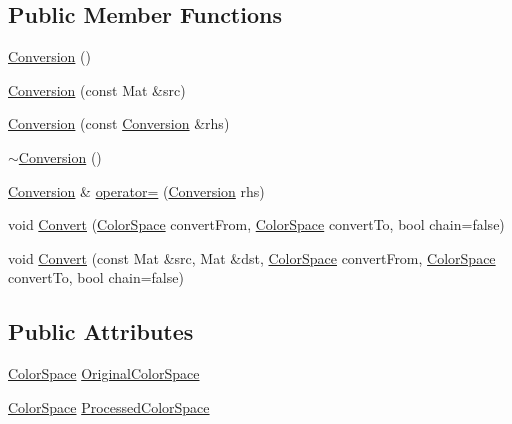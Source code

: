 \subsection*{Public Member Functions}
\begin{DoxyCompactItemize}
\item 
\hyperlink{class_vision_1_1_conversion_ade9665873e1ebd5e07f458d9dcf10996}{Conversion} ()
\item 
\hyperlink{class_vision_1_1_conversion_a9d881d8a0fc29f26afb84422fd8599f4}{Conversion} (const Mat \&src)
\item 
\hyperlink{class_vision_1_1_conversion_ada85747609dcedb2a117f06fd5c033ce}{Conversion} (const \hyperlink{class_vision_1_1_conversion}{Conversion} \&rhs)
\item 
\hyperlink{class_vision_1_1_conversion_a9a22cb622c0e847fa4635e7194c76d4d}{$\sim$\+Conversion} ()
\item 
\hyperlink{class_vision_1_1_conversion}{Conversion} \& \hyperlink{class_vision_1_1_conversion_ac1a6958a4d331108ad61f346f06319c7}{operator=} (\hyperlink{class_vision_1_1_conversion}{Conversion} rhs)
\item 
void \hyperlink{class_vision_1_1_conversion_ac78b687a5b6cdf4c0ae812b5d76b13fc}{Convert} (\hyperlink{class_vision_1_1_conversion_a0a21d4ccbb013185f1974d35ec86e388}{Color\+Space} convert\+From, \hyperlink{class_vision_1_1_conversion_a0a21d4ccbb013185f1974d35ec86e388}{Color\+Space} convert\+To, bool chain=false)
\item 
void \hyperlink{class_vision_1_1_conversion_a7795d9d544e89e672acff2747b2218f0}{Convert} (const Mat \&src, Mat \&dst, \hyperlink{class_vision_1_1_conversion_a0a21d4ccbb013185f1974d35ec86e388}{Color\+Space} convert\+From, \hyperlink{class_vision_1_1_conversion_a0a21d4ccbb013185f1974d35ec86e388}{Color\+Space} convert\+To, bool chain=false)
\end{DoxyCompactItemize}
\subsection*{Public Attributes}
\begin{DoxyCompactItemize}
\item 
\hyperlink{class_vision_1_1_conversion_a0a21d4ccbb013185f1974d35ec86e388}{Color\+Space} \hyperlink{class_vision_1_1_conversion_a3fd4bac8a8d6788b6a1886916c5464b4}{Original\+Color\+Space}
\item 
\hyperlink{class_vision_1_1_conversion_a0a21d4ccbb013185f1974d35ec86e388}{Color\+Space} \hyperlink{class_vision_1_1_conversion_a57337750cb60b9ff7ed269c184d1fda7}{Processed\+Color\+Space}
\end{DoxyCompactItemize}
